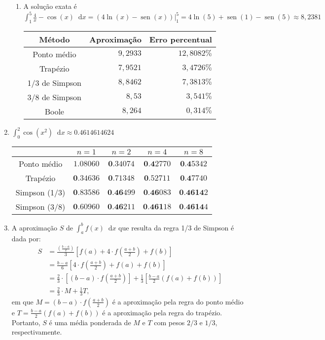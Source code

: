 \documentclass[12pt,a4paper]{article}
\newcommand*\sen{\operatorname{sen}}
\newcommand*\diff{\mathop{}\!\mathrm{d}}
\begin{document}
\begin{enumerate}
\begin{enumerate}
\item A solução exata é $\int_1^5 \frac{4}{x} - \cos(x) \diff{x} = \left( 4\ln(x) - \sen(x)\right) \Big|_1^5 = 4\ln(5) + \sen(1) - \sen(5) \approx 8,2381$
\begin{center}
\begin{tabular}{crr}
\hline
Método         & Aproximação & Erro percentual \\ \hline
Ponto médio    & $9,2933$ &  $12,8082\%$  \\
Trapézio       & $7,9521$ & $3,4726\%$ \\
1/3 de Simpson & $8,8462$ & $7,3813\%$ \\
3/8 de Simpson & $8,53$ & $3,541\%$ \\
Boole          & $8,264$ & $0,314\%$ \\
\hline
\end{tabular}
\end{center}
\end{enumerate}
\item $\int_0^2 \cos(x^2)\diff{x} \approx 0.4614614624$
\begin{center}
\begin{tabular}{ccccc}
\hline
              & $n=1$     & $n=2$    & $n=4$   & $n=8$ \\ \hline
Ponto médio   & $1.08060$ & $\textbf{0}.34074$ & $\textbf{0.4}2770$ & $\textbf{0.4}5342$ \\
Trapézio      & $\textbf{0}.34636$ & $\textbf{0}.71348$ & $\textbf{0}.52711$ & $\textbf{0.4}7740$ \\
Simpson (1/3) & $\textbf{0}.83586$ & $\textbf{0.46}499$ & $\textbf{0.46}083$ & $\textbf{0.4614}2$ \\
Simpson (3/8) & $\textbf{0}.60960$ & $\textbf{0.46}211$ & $\textbf{0.461}18$ & $\textbf{0.4614}4$ \\
\hline
\end{tabular}
\end{center}
\item A aproximação $S$ de $\int_a^b f(x)\diff{x}$ que resulta da regra 1/3 de Simpson é dada por:
\begin{align*}
S
& = \frac{\left(\frac{b - a}{2}\right)}{3}\left[ f(a) + 4\cdot f\left(\frac{a + b}{2}\right) + f(b) \right] \\
& = \frac{b - a}{6} \left[ 4\cdot f\left(\frac{a + b}{2}\right) + f(a) + f(b) \right] \\
& = \frac{2}{3} \cdot \left[ (b - a) \cdot f\left(\frac{a + b}{2}\right)\right]
    + \frac{1}{3} \left[ \frac{b - a}{2} \left(f(a) + f(b) \right)\right] \\
& = \frac{2}{3} \cdot M + \frac{1}{3} T,
\end{align*}
em que $M = (b - a) \cdot f\left(\frac{a + b}{2}\right)$ é a aproximação pela regra do ponto médio e $T = \frac{b - a}{2} \left(f(a) + f(b) \right)$ é a aproximação pela regra do trapézio. Portanto, $S$ é uma média ponderada de $M$ e $T$ com pesos $2/3$ e $1/3$, respectivamente.


\end{enumerate}
\end{document}

